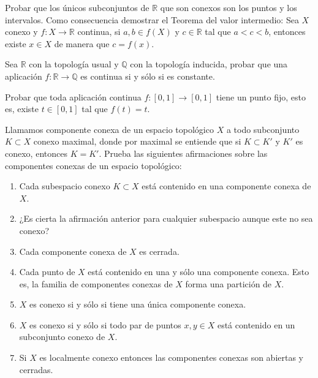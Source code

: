 \begin{ejer}[137]
Probar que los únicos subconjuntos de $\mathbb{R}$ que son conexos son los puntos y los intervalos. Como consecuencia demostrar el Teorema del valor intermedio: Sea $X$ conexo y $f \colon X \to \mathbb{R}$ continua, si $a, b \in f(X)$ y $c \in \mathbb{R}$ tal que $a < c < b$, entonces existe $x \in X$ de manera que $c = f(x)$.
\end{ejer}

\begin{ejer}[138]
Sea $\mathbb{R}$ con la topología usual y $\mathbb{Q}$ con la topología inducida, probar que una aplicación $f \colon \mathbb{R} \to \mathbb{Q}$ es continua si y sólo si es constante.
\end{ejer}

\begin{ejer}[139]
Probar que toda aplicación continua $f \colon [0,1] \to [0,1]$ tiene un punto fijo, esto es, existe $t \in [0,1]$ tal que $f(t) = t$.
\end{ejer}

\begin{ejer}[140]
Llamamos componente conexa de un espacio topológico $X$ a todo subconjunto $K \subset X$ conexo maximal, donde por maximal se entiende que si $K \subset K'$ y $K'$ es conexo, entonces $K = K'$. Prueba las siguientes afirmaciones sobre las componentes conexas de un espacio topológico:
\begin{enumerate}
    \item[a)] Cada subespacio conexo $K \subset X$ está contenido en una componente conexa de $X$.
    \item[b)] ¿Es cierta la afirmación anterior para cualquier subespacio aunque este no sea conexo?
    \item[c)] Cada componente conexa de $X$ es cerrada.
    \item[d)] Cada punto de $X$ está contenido en una y sólo una componente conexa. Esto es, la familia de componentes conexas de $X$ forma una partición de $X$.
    \item[e)] $X$ es conexo si y sólo si tiene una única componente conexa.
    \item[f)] $X$ es conexo si y sólo si todo par de puntos $x, y \in X$ está contenido en un subconjunto conexo de $X$.
    \item[g)] Si $X$ es localmente conexo entonces las componentes conexas son abiertas y cerradas.
\end{enumerate}
\end{ejer}

